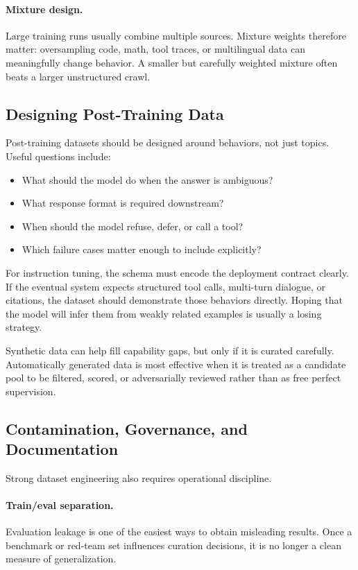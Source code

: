 \documentclass[class=article,crop=false]{standalone}
\begin{document}
\paragraph{Mixture design.}
Large training runs usually combine multiple sources. Mixture weights therefore matter: oversampling code, math, tool traces, or multilingual data can meaningfully change behavior. A smaller but carefully weighted mixture often beats a larger unstructured crawl.

\subsection{Designing Post-Training Data}
\label{sec:data:posttraining}

Post-training datasets should be designed around behaviors, not just topics. Useful questions include:
\begin{itemize}
  \item What should the model do when the answer is ambiguous?
  \item What response format is required downstream?
  \item When should the model refuse, defer, or call a tool?
  \item Which failure cases matter enough to include explicitly?
\end{itemize}

For instruction tuning, the schema must encode the deployment contract clearly. If the eventual system expects structured tool calls, multi-turn dialogue, or citations, the dataset should demonstrate those behaviors directly. Hoping that the model will infer them from weakly related examples is usually a losing strategy.

Synthetic data can help fill capability gaps, but only if it is curated carefully. Automatically generated data is most effective when it is treated as a candidate pool to be filtered, scored, or adversarially reviewed rather than as free perfect supervision.

\subsection{Contamination, Governance, and Documentation}
\label{sec:data:governance}

Strong dataset engineering also requires operational discipline.

\paragraph{Train/eval separation.}
Evaluation leakage is one of the easiest ways to obtain misleading results. Once a benchmark or red-team set influences curation decisions, it is no longer a clean measure of generalization.
\end{document}
